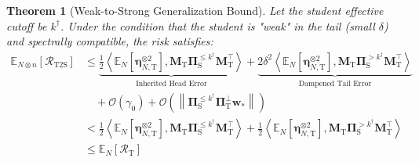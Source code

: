\documentclass{article}
\theoremstyle{definition}
\theoremstyle{definition}
\theoremstyle{plain}
\newtheorem{theorem}{Theorem}
\theoremstyle{plain}
\theoremstyle{plain}
\theoremstyle{plain}
\theoremstyle{plain}
\newcommand{\bs}[1]{\boldsymbol{\mathbf{#1}}}
\newcommand{\te}{\mathrm{T}}
\newcommand{\st}{\mathrm{S}}
\newcommand{\M}{\mathbf{M}}
\newcommand{\w}{\mathbf{w}}
\newcommand{\ex}[2][]{\mathbb{E}_{#1}\left[ #2 \right]}
\newcommand{\inner}[1]{\left\langle#1\right\rangle}
\begin{document}
\begin{theorem}[Weak-to-Strong Generalization Bound]
    Let the student effective cutoff be $k^\dagger$. Under the condition that the student is "weak" in the tail (small $\delta$) and spectrally compatible, the risk satisfies:
    \begin{equation}
    \begin{aligned}
        \ex[N\otimes n]{\mathcal{R}_{\mathrm{T2S}}}&\leq \underbrace{\frac{1}{2}\inner{\ex[N]{\bs\eta_{N,\te}^{\otimes 2}},\M_\te\bs \Pi_{\st}^{\leq k^\dagger}\M_\te^\top}}_{\text{Inherited Head Error}} + \underbrace{2\delta^2\inner{\ex[N]{\bs\eta_{N,\te}^{\otimes 2}},\M_\te\bs \Pi_{\st}^{> k^\dagger}\M_\te^\top}}_{\text{Dampened Tail Error}} \\
        &\quad + \mathcal{O}(\gamma_0) + \mathcal{O}\left(\left\|\bs \Pi_{\st}^{\leq k^\dagger}\bs \Pi_{\te}^{\perp}\w_{*}\right\|\right) \\
        &< \frac{1}{2}\inner{\ex[N]{\bs\eta_{N,\te}^{\otimes 2}},\M_\te\bs \Pi_{\st}^{\leq k^\dagger}\M_\te^\top} + \frac{1}{2}\inner{\ex[N]{\bs\eta_{N,\te}^{\otimes 2}},\M_\te\bs \Pi_{\st}^{> k^\dagger}\M_\te^\top} \\
        &\leq \ex[N]{\mathcal{R}_{\mathrm{T}}}
    \end{aligned}
    \end{equation}
\end{theorem}
\end{document}
